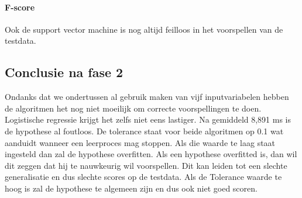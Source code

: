 \paragraph{F-score}

Ook de support vector machine is nog altijd feilloos in het voorspellen van de testdata. 


\subsection{Conclusie na fase 2}
Ondanks dat we ondertussen al gebruik maken van vijf inputvariabelen hebben de algoritmen het nog niet moeilijk om correcte voorspellingen te doen. Logistische regressie krijgt het zelfs niet eens lastiger. Na gemiddeld 8,891 ms is de hypothese al foutloos. De tolerance staat voor beide algoritmen op 0.1 wat aanduidt wanneer een leerproces mag stoppen. Als die waarde te laag staat ingesteld dan zal de hypothese overfitten. Als een hypothese overfitted is, dan wil dit zeggen dat hij te nauwkeurig wil voorspellen. Dit kan leiden tot een slechte generalisatie en dus slechte scores op de testdata. Als de Tolerance waarde te hoog is zal de hypothese te algemeen zijn en dus ook niet goed scoren. 